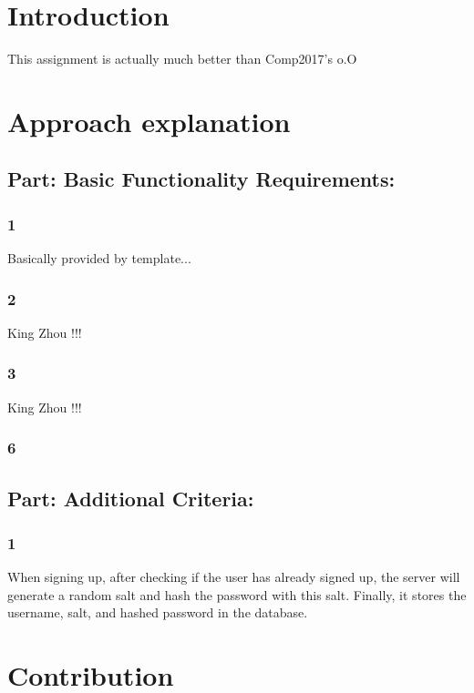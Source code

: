 \documentclass[12pt]{article}
\begin{document}
\section{Introduction}

This assignment is actually much better than Comp2017's o.O

\section{Approach explanation}
    \subsection*{Part: Basic Functionality Requirements:}
        \subsubsection*{1} Basically provided by template...

        \subsubsection*{2} King Zhou !!!

        \subsubsection*{3} King Zhou !!!

        \subsubsection*{6} 

    \subsection*{Part: Additional Criteria:}

        \subsubsection*{1} When signing up, after checking if the user has already signed up, the server will generate a random salt and hash the password with this salt. Finally, it stores the username, salt, and hashed password in the database.

\section{Contribution}
\end{document}
